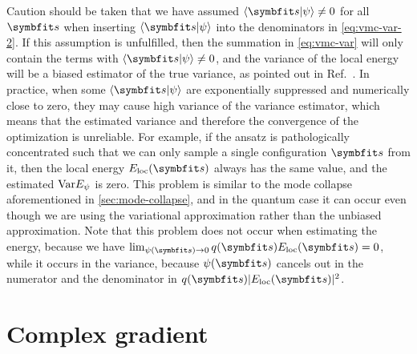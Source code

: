 Caution should be taken that we have assumed $\ip{\vs}{\psi} \neq 0$ for all $\vs$ when inserting $\ip{\vs}{\psi}$ into the denominators in \cref{eq:vmc-var-2}. If this assumption is unfulfilled, then the summation in \cref{eq:vmc-var} will only contain the terms with $\ip{\vs}{\psi} \neq 0$, and the variance of the local energy will be a biased estimator of the true variance, as pointed out in Ref.~\cite{sinibaldi2023unbiasing}. In practice, when some $\ip{\vs}{\psi}$ are exponentially suppressed and numerically close to zero, they may cause high variance of the variance estimator, which means that the estimated variance and therefore the convergence of the optimization is unreliable. For example, if the ansatz is pathologically concentrated such that we can only sample a single configuration $\vs$ from it, then the local energy $E_\text{loc}(\vs)$ always has the same value, and the estimated $\mathrm{Var} E_\psi$ is zero. This problem is similar to the mode collapse aforementioned in \cref{sec:mode-collapse}, and in the quantum case it can occur even though we are using the variational approximation rather than the unbiased approximation. Note that this problem does not occur when estimating the energy, because we have $\lim_{\psi(\vs) \to 0} q(\vs) E_\text{loc}(\vs) = 0$, while it occurs in the variance, because $\psi(\vs)$ cancels out in the numerator and the denominator in $q(\vs) |E_\text{loc}(\vs)|^2$.

\section{Complex gradient}
\label{sec:cmpl-grad}

